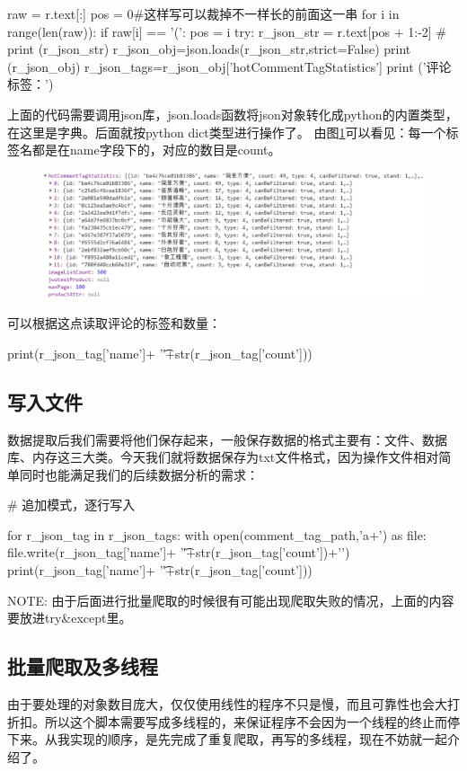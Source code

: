 \begin{python}
raw = r.text[:]
pos = 0#这样写可以裁掉不一样长的前面这一串
for i in range(len(raw)):
    if raw[i] == '(':
        pos = i
try:
    r_json_str = r.text[pos + 1:-2]
    # print (r_json_str)
    r_json_obj=json.loads(r_json_str,strict=False)
    print (r_json_obj)
    r_json_tags=r_json_obj['hotCommentTagStatistics']
    print ('评论标签：')
\end{python}
上面的代码需要调用json库，json.loads函数将json对象转化成python的内置类型，在这里是字典。后面就按python dict类型进行操作了。
由图\ref{img:yhb7}可以看见：每一个标签名都是在name字段下的，对应的数目是count。
\begin{figure}[htbp]
\centering
\includegraphics[width=13.5cm]{img/yhb/cmt_tags_eg_jd.png}
\label{img:yhb7}   %
\end{figure}
可以根据这点读取评论的标签和数量：
\begin{python}
print(r_json_tag['name']+
                      '\t'+str(r_json_tag['count']))
\end{python}
\subsection{写入文件}
数据提取后我们需要将他们保存起来，一般保存数据的格式主要有：文件、数据库、内存这三大类。今天我们就将数据保存为txt文件格式，因为操作文件相对简单同时也能满足我们的后续数据分析的需求：
\begin{python}
# 追加模式，逐行写入

        for r_json_tag in r_json_tags:
            with open(comment_tag_path,'a+') as file:
                file.write(r_json_tag['name']+
                           '\t'+str(r_json_tag['count'])+'\n')
                print(r_json_tag['name']+
                      '\t'+str(r_json_tag['count']))
\end{python}
NOTE: 由于后面进行批量爬取的时候很有可能出现爬取失败的情况，上面的内容要放进try\&except里。

\subsection{批量爬取及多线程}
由于要处理的对象数目庞大，仅仅使用线性的程序不只是慢，而且可靠性也会大打折扣。所以这个脚本需要写成多线程的，来保证程序不会因为一个线程的终止而停下来。从我实现的顺序，是先完成了重复爬取，再写的多线程，现在不妨就一起介绍了。

